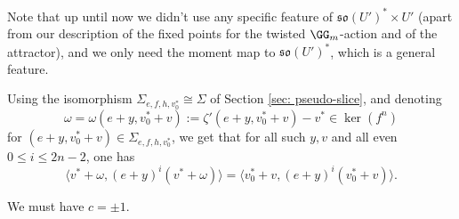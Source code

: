 \documentclass[11pt]{article}
\begin{document}
\begin{remark}
    Note that up until now we didn't use any specific feature of $\mathfrak{so}(U')^*\times U'$ (apart from our description of the fixed points for the twisted $\GG_m$-action and of the attractor), and we only need the moment map to $\mathfrak{so}(U')^*$, which is a general feature.
\end{remark}
Using the isomorphism $\Sigma_{e,f,h,v_0^*}\cong \Sigma$ of Section \ref{sec: pseudo-slice}, and denoting $$\omega=\omega(e+y,v_0^*+v):=\zeta'(e+y,v_0^*+v)-v^*\in \ker(f^n)$$ for $(e+y, v_0^*+v)\in \Sigma_{e,f,h,v_0^*}$, we get that for all such $y,v$ and all even $0\leq i \leq 2n-2$, one has
\begin{equation}\label{eq: section invariants}
    \langle v^*+\omega, (e+y)^{i} (v^*+\omega)\rangle = \langle v_0^*+v, (e+y)^{i} (v_0^*+v)\rangle.
\end{equation}
\begin{proposition}
    We must have $c=\pm 1$.
\end{proposition}
\end{document}
